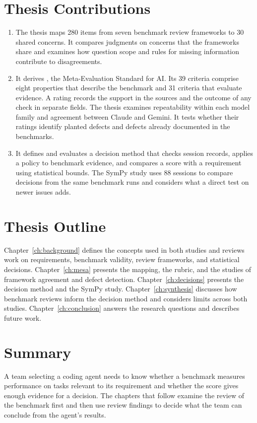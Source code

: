\section{Thesis Contributions}
\label{sec:intro_contributions}

\begin{enumerate}
    \item The thesis maps 280 items from seven benchmark review frameworks to 30 shared concerns. It compares judgments on concerns that the frameworks share and examines how question scope and rules for missing information contribute to disagreements.
    \item It derives \mesa{}, the Meta-Evaluation Standard for AI. Its 39 criteria comprise eight properties that describe the benchmark and 31 criteria that evaluate evidence. A rating records the support in the sources and the outcome of any check in separate fields. The thesis examines repeatability within each model family and agreement between Claude and Gemini. It tests whether their ratings identify planted defects and defects already documented in the benchmarks.
    \item It defines and evaluates a decision method that checks session records, applies a policy to benchmark evidence, and compares a score with a requirement using statistical bounds. The SymPy study uses 88 sessions to compare decisions from the same benchmark runs and considers what a direct test on newer issues adds.
\end{enumerate}

\section{Thesis Outline}
\label{sec:intro_outline}

Chapter~\ref{ch:background} defines the concepts used in both studies and reviews work on requirements, benchmark validity, review frameworks, and statistical decisions. Chapter~\ref{ch:mesa} presents the mapping, the rubric, and the studies of framework agreement and defect detection. Chapter~\ref{ch:decisions} presents the decision method and the SymPy study. Chapter~\ref{ch:synthesis} discusses how benchmark reviews inform the decision method and considers limits across both studies. Chapter~\ref{ch:conclusion} answers the research questions and describes future work.

\section{Summary}
\label{sec:intro_summary}

A team selecting a coding agent needs to know whether a benchmark measures performance on tasks relevant to its requirement and whether the score gives enough evidence for a decision. The chapters that follow examine the review of the benchmark first and then use review findings to decide what the team can conclude from the agent's results.
